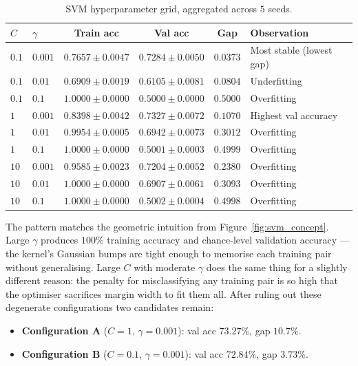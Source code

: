 \documentclass[11pt]{article}
\begin{document}
\begin{table}[H]
  \centering
  \small
  \caption{SVM hyperparameter grid, aggregated across $5$ seeds.}
  \label{tab:gridsearch}
  \begin{tabular}{@{}llcccl@{}}
    \toprule
    \textbf{$C$} & \textbf{$\gamma$} & \textbf{Train acc} & \textbf{Val acc}
        & \textbf{Gap} & \textbf{Observation} \\
    \midrule
    $0.1$ & $0.001$ & $0.7657\pm0.0047$ & $0.7284\pm0.0050$ & $0.0373$
        & Most stable (lowest gap) \\
    $0.1$ & $0.01$  & $0.6909\pm0.0019$ & $0.6105\pm0.0081$ & $0.0804$
        & Underfitting \\
    $0.1$ & $0.1$   & $1.0000\pm0.0000$ & $0.5000\pm0.0000$ & $0.5000$
        & Overfitting \\
    $1$   & $0.001$ & $0.8398\pm0.0042$ & $0.7327\pm0.0072$ & $0.1070$
        & Highest val accuracy \\
    $1$   & $0.01$  & $0.9954\pm0.0005$ & $0.6942\pm0.0073$ & $0.3012$
        & Overfitting \\
    $1$   & $0.1$   & $1.0000\pm0.0000$ & $0.5001\pm0.0003$ & $0.4999$
        & Overfitting \\
    $10$  & $0.001$ & $0.9585\pm0.0023$ & $0.7204\pm0.0052$ & $0.2380$
        & Overfitting \\
    $10$  & $0.01$  & $1.0000\pm0.0000$ & $0.6907\pm0.0061$ & $0.3093$
        & Overfitting \\
    $10$  & $0.1$   & $1.0000\pm0.0000$ & $0.5002\pm0.0004$ & $0.4998$
        & Overfitting \\
    \bottomrule
  \end{tabular}
\end{table}

The pattern matches the geometric intuition from
Figure~\ref{fig:svm_concept}. Large $\gamma$ produces $100\%$ training accuracy
and chance-level validation accuracy --- the kernel's Gaussian bumps are tight
enough to memorise each training pair without generalising. Large $C$ with
moderate $\gamma$ does the same thing for a slightly different reason: the
penalty for misclassifying any training pair is so high that the optimiser
sacrifices margin width to fit them all. After ruling out these degenerate
configurations two candidates remain:

\begin{itemize}\setlength\itemsep{1pt}
  \item \textbf{Configuration A} ($C=1$, $\gamma=0.001$): val acc
        $73.27\%$, gap $10.7\%$.
  \item \textbf{Configuration B} ($C=0.1$, $\gamma=0.001$): val acc
        $72.84\%$, gap $3.73\%$.
\end{itemize}
\end{document}
